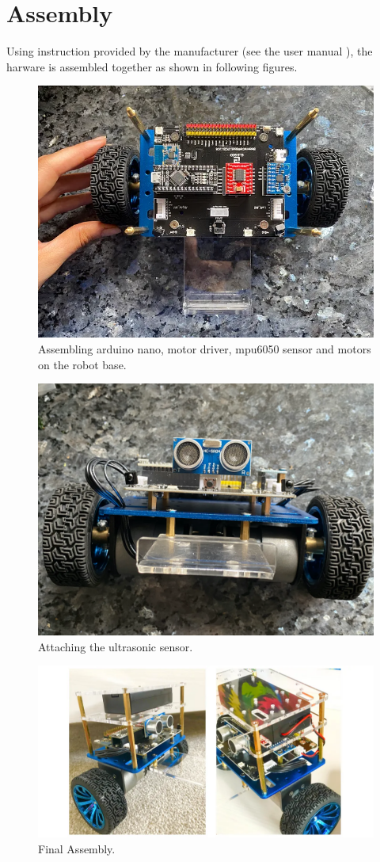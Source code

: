 \section{Assembly}
Using instruction provided by the manufacturer (see the user manual \cite{tumbller}), the harware is assembled together as shown in following figures. 
\begin{figure}[H]
	\centering
	\includegraphics[width=0.7\linewidth]{assets/assembly1}
	\caption{Assembling arduino nano, motor driver, mpu6050 sensor and motors on the robot base.}
	\label{fig:assembly1}
\end{figure}

\begin{figure}[H]
	\centering
	\includegraphics[width=0.7\linewidth]{assets/assembly2}
	\caption{Attaching the ultrasonic sensor.}
	\label{fig:assembly2}
\end{figure}

\begin{figure}[H]
	\centering
	\includegraphics[width=0.7\linewidth]{assets/assembly3}
	\caption{Final Assembly.}
	\label{fig:assembly3}
\end{figure}